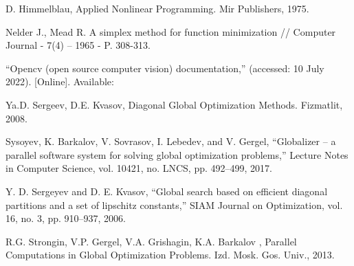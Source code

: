 \documentclass{svproc}
\begin{document}
\begin{thebibliography}{6}
D. Himmelblau, Applied Nonlinear Programming. Mir Publishers, 1975.

Nelder J., Mead R. A simplex method for function minimization // Computer Journal - 7(4) – 1965 - P. 308-313.

“Opencv (open source computer vision) documentation,” (accessed: 10 July 2022).
[Online]. Available: %


Ya.D. Sergeev, D.E. Kvasov, Diagonal Global Optimization Methods. Fizmatlit, 2008.

Sysoyev, K. Barkalov, V. Sovrasov, I. Lebedev, and V. Gergel, “Globalizer – a parallel software system for solving global optimization problems,” Lecture Notes in Computer Science, vol. 10421, no. LNCS, pp. 492–499, 2017.

Y. D. Sergeyev and D. E. Kvasov, “Global search based on efficient diagonal partitions and a set of lipschitz constants,” SIAM Journal on Optimization, vol. 16, no. 3, pp. 910–937, 2006.

R.G. Strongin, V.P. Gergel, V.A. Grishagin, K.A. Barkalov , Parallel Computations in Global Optimization Problems. Izd. Mosk. Gos. Univ., 2013.









\end{thebibliography}
\end{document}

